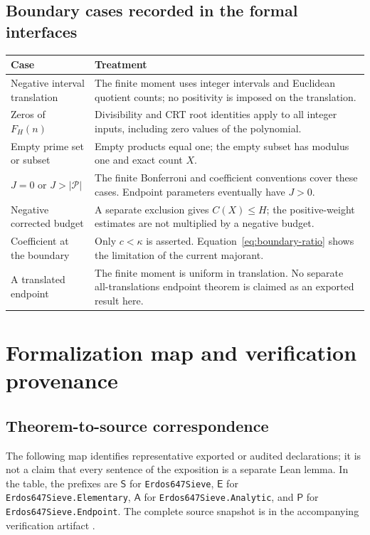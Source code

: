 \documentclass[11pt,a4paper]{article}
\theoremstyle{definition}
\theoremstyle{remark}
\numberwithin{equation}{section}
\newcommand{\Pset}{\mathcal P}
\newcommand{\rate}{\kappa}
\newcommand{\smallcode}[1]{{\small\texttt{#1}}}
\begin{document}
\subsection{Boundary cases recorded in the formal interfaces}
\begin{center}
\begin{tabularx}{\textwidth}{@{}p{}X@{}}
\toprule
Case & Treatment \\
\midrule
Negative interval translation & The finite moment uses integer intervals and Euclidean quotient counts; no positivity is imposed on the translation. \\
Zeros of $F_H(n)$ & Divisibility and CRT root identities apply to all integer inputs, including zero values of the polynomial. \\
Empty prime set or subset & Empty products equal one; the empty subset has modulus one and exact count $X$. \\
$J=0$ or $J>|\Pset|$ & The finite Bonferroni and coefficient conventions cover these cases. Endpoint parameters eventually have $J>0$. \\
Negative corrected budget & A separate exclusion gives $C(X)\le H$; the positive-weight estimates are not multiplied by a negative budget. \\
Coefficient at the boundary & Only $c<\rate$ is asserted. Equation~\eqref{eq:boundary-ratio} shows the limitation of the current majorant. \\
A translated endpoint & The finite moment is uniform in translation. No separate all-translations endpoint theorem is claimed as an exported result here. \\
\bottomrule
\end{tabularx}
\end{center}

\section{Formalization map and verification provenance}\label{app:evidence}
\subsection{Theorem-to-source correspondence}\label{app:map}
The following map identifies representative exported or audited declarations;
it is not a claim that every sentence of the exposition is a separate Lean
lemma. In the table, the prefixes are
$\mathsf{S}$ for \smallcode{Erdos647Sieve},
$\mathsf{E}$ for \smallcode{Erdos647Sieve.Elementary},
$\mathsf{A}$ for \smallcode{Erdos647Sieve.Analytic}, and
$\mathsf{P}$ for \smallcode{Erdos647Sieve.Endpoint}.
The complete source snapshot is in the accompanying verification artifact
\citep{SieveArtifact}.
\end{document}
